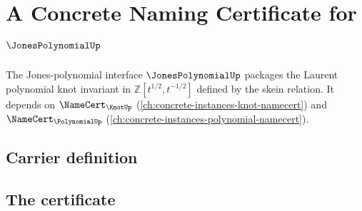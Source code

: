 \chapter{A Concrete Naming Certificate for $\JonesPolynomialUp$}
\label{ch:concrete-instances-jonespolynomial-namecert}

The Jones-polynomial interface $\JonesPolynomialUp$ packages the Laurent polynomial knot invariant in $\mathbb{Z}[t^{1/2}, t^{-1/2}]$ defined by the skein relation. It depends on $\NameCert_{\KnotUp}$ (\autoref{ch:concrete-instances-knot-namecert}) and $\NameCert_{\PolynomialUp}$ (\autoref{ch:concrete-instances-polynomial-namecert}).

\section{Carrier definition}
\label{sec:jonespolynomial-carrier}

\section{The certificate}
\label{sec:jonespolynomial-certificate}

